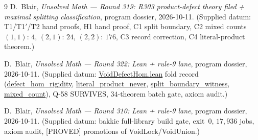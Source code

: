 \documentclass[11pt,a4paper]{article}
\theoremstyle{definition}
\begin{document}
\begin{thebibliography}{9}
D.~Blair,
\emph{Unsolved Math --- Round 319: R303 product-defect theory filed +
maximal splitting classification},
program dossier, 2026-10-11.
(Supplied datum: T1/T1$'$/T2 hand proofs, H1 hand proof, C1 split
boundary, C2 mixed counts $(1,1){:}\,4$, $(2,1){:}\,24$, $(2,2){:}\,176$,
C3 record correction, C4 literal-product theorem.)

D.~Blair,
\emph{Unsolved Math --- Round 322: Lean + rule-9 lane},
program dossier, 2026-10-11.
(Supplied datum: \url{VoidDefectHom.lean} fold record
(\url{defect_hom_rigidity}, \url{literal_product_never},
\url{split_boundary_witness}, \url{mixed_count}), Q-58
SURVIVES, $34$-theorem batch gate, axiom audit.)

D.~Blair,
\emph{Unsolved Math --- Round 310: Lean + rule-9 lane},
program dossier, 2026-10-11.
(Supplied datum: bakkie full-library build gate, exit~0, $17{,}936$
jobs, axiom audit, [PROVED] promotions of VoidLock/VoidUnion.)

\end{thebibliography}
\end{document}
